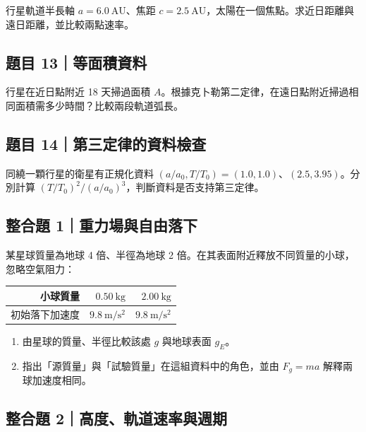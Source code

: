 \documentclass[11pt,a4paper]{article}
\newcounter{none}
\providecommand{\tightlist}{%
  \setlength{\itemsep}{0pt}\setlength{\parskip}{0pt}}
\begin{document}
行星軌道半長軸 \(a=6.0\ \mathrm{AU}\)、焦距 \(c=2.5\ \mathrm{AU}\)，太陽在一個焦點。求近日距離與遠日距離，並比較兩點速率。

\subsection{題目 13｜等面積資料}\label{ux984cux76ee-13ux7b49ux9762ux7a4dux8cc7ux6599}

行星在近日點附近 18 天掃過面積 \(A\)。根據克卜勒第二定律，在遠日點附近掃過相同面積需多少時間？比較兩段軌道弧長。

\subsection{題目 14｜第三定律的資料檢查}\label{ux984cux76ee-14ux7b2cux4e09ux5b9aux5f8bux7684ux8cc7ux6599ux6aa2ux67e5}

同繞一顆行星的衛星有正規化資料 \((a/a_0,T/T_0)=(1.0,1.0)\)、\((2.5,3.95)\)。分別計算 \((T/T_0)^2/(a/a_0)^3\)，判斷資料是否支持第三定律。

\subsection{整合題 1｜重力場與自由落下}\label{ux6574ux5408ux984c-1ux91cdux529bux5834ux8207ux81eaux7531ux843dux4e0b}

某星球質量為地球 4 倍、半徑為地球 2 倍。在其表面附近釋放不同質量的小球，忽略空氣阻力：

{\def\LTcaptype{none} %
\begin{longtable}[]{@{}rrr@{}}
\toprule\noalign{}
小球質量 & \(0.50\ \mathrm{kg}\) & \(2.00\ \mathrm{kg}\) \\
\midrule\noalign{}
\endhead
\bottomrule\noalign{}
\endlastfoot
初始落下加速度 & \(9.8\ \mathrm{m/s^2}\) & \(9.8\ \mathrm{m/s^2}\) \\
\end{longtable}
}

\begin{enumerate}
\def\labelenumi{\arabic{enumi}.}
\tightlist
\item
  由星球的質量、半徑比較該處 \(g\) 與地球表面 \(g_E\)。
\item
  指出「源質量」與「試驗質量」在這組資料中的角色，並由 \(F_g=ma\) 解釋兩球加速度相同。
\end{enumerate}

\subsection{整合題 2｜高度、軌道速率與週期}\label{ux6574ux5408ux984c-2ux9ad8ux5ea6ux8eccux9053ux901fux7387ux8207ux9031ux671f}
\end{document}
